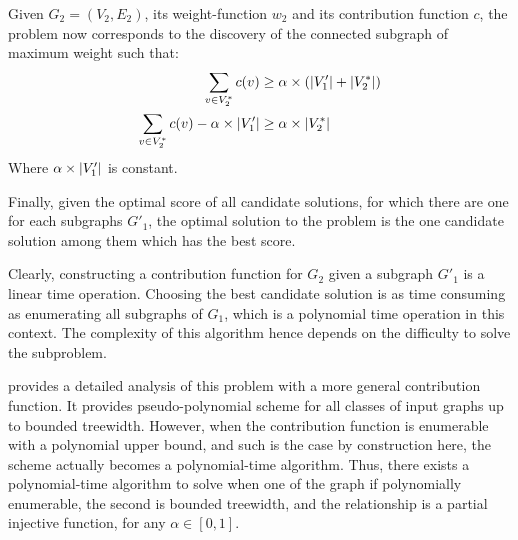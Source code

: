 			Given $G_2=(V_2,E_2)$, its weight-function $w_2$ and its contribution function $c$, the problem now corresponds to the discovery of the connected subgraph of maximum weight such that:
			\begin{align*}
				\sum_{v \in V^*_2}{c(v)}                           &\geq \alpha\times\left(\lvert V'_1\rvert + \lvert V^*_2\rvert\right) \\
				\sum_{v \in V^*_2}{c(v)} - \alpha\times\lvert V'_1\rvert &\geq \alpha\times\lvert V^*_2\rvert
			\end{align*}
			Where $\alpha\times\lvert V_1'\rvert$ is constant.

			Finally, given the optimal score of all candidate solutions, for which there are one for each subgraphs $G'_1$, the optimal solution to the \mwccs{} problem is the one candidate solution among them which has the best score.

			Clearly, constructing a contribution function for $G_2$ given a subgraph $G'_1$ is a linear time operation. Choosing the best candidate solution is as time consuming as enumerating all subgraphs of $G_1$, which is a polynomial time operation in this context. The complexity of this algorithm hence depends on the difficulty to solve the \rbmwcs{} subproblem.

			 provides a detailed analysis of this problem with a more general contribution function.
			It provides pseudo-polynomial scheme for all classes of input graphs up to bounded treewidth.
			However, when the contribution function is enumerable with a polynomial upper bound, and such is the case by construction here, the scheme actually becomes a polynomial-time algorithm.
			Thus, there exists a polynomial-time algorithm to solve \mwccs{} when one of the graph if polynomially enumerable, the second is bounded treewidth, and the relationship is a partial injective function, for any $\alpha \in [0, 1]$.
